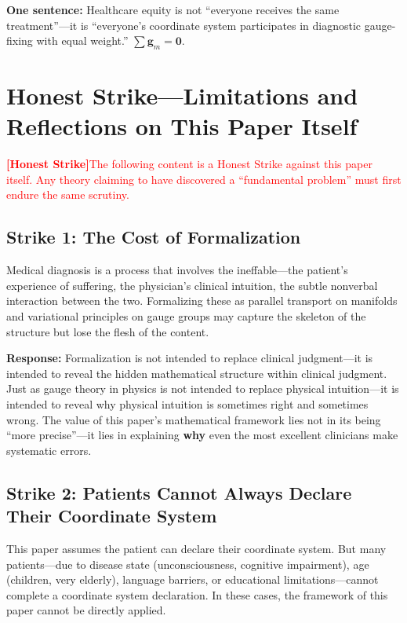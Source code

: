 \documentclass[12pt,a4paper]{article}
\theoremstyle{remark}
\newcommand{\honestcrit}[1]{%
    \textcolor{red}{\textbf{[Honest Strike]}#1}%
}
\begin{document}
\textbf{One sentence:} Healthcare equity is not ``everyone receives the same treatment''---it is ``everyone's coordinate system participates in diagnostic gauge-fixing with equal weight.'' $\sum \mathbf{g}_m = \mathbf{0}$.

\section{Honest Strike---Limitations and Reflections on This Paper Itself}
\label{sec:honest_strike}

\honestcrit{The following content is a Honest Strike against this paper itself. Any theory claiming to have discovered a ``fundamental problem'' must first endure the same scrutiny.}

\subsection{Strike 1: The Cost of Formalization}

Medical diagnosis is a process that involves the ineffable---the patient's experience of suffering, the physician's clinical intuition, the subtle nonverbal interaction between the two. Formalizing these as parallel transport on manifolds and variational principles on gauge groups may capture the skeleton of the structure but lose the flesh of the content.

\textbf{Response:} Formalization is not intended to replace clinical judgment---it is intended to reveal the hidden mathematical structure within clinical judgment. Just as gauge theory in physics is not intended to replace physical intuition---it is intended to reveal why physical intuition is sometimes right and sometimes wrong. The value of this paper's mathematical framework lies not in its being ``more precise''---it lies in explaining \textbf{why} even the most excellent clinicians make systematic errors.

\subsection{Strike 2: Patients Cannot Always Declare Their Coordinate System}

This paper assumes the patient can declare their coordinate system. But many patients---due to disease state (unconsciousness, cognitive impairment), age (children, very elderly), language barriers, or educational limitations---cannot complete a coordinate system declaration. In these cases, the framework of this paper cannot be directly applied.
\end{document}

